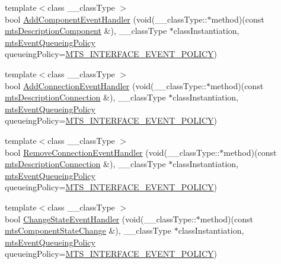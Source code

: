 \begin{DoxyCompactItemize}
\item 
{\footnotesize template$<$class \-\_\-\-\_\-class\-Type $>$ }\\bool \hyperlink{classmts_manager_component_services_aac555ce8c3bc4017ccbd8bb1d6aa40ad}{Add\-Component\-Event\-Handler} (void(\-\_\-\-\_\-class\-Type\-::$\ast$method)(const \hyperlink{classmts_description_component}{mts\-Description\-Component} \&), \-\_\-\-\_\-class\-Type $\ast$class\-Instantiation, \hyperlink{mts_forward_declarations_8h_a9286ac2ca46e5bcd57059550faa96916}{mts\-Event\-Queueing\-Policy} queueing\-Policy=\hyperlink{mts_forward_declarations_8h_a9286ac2ca46e5bcd57059550faa96916a3d4338e85690d50e9ab167be77cdefa0}{M\-T\-S\-\_\-\-I\-N\-T\-E\-R\-F\-A\-C\-E\-\_\-\-E\-V\-E\-N\-T\-\_\-\-P\-O\-L\-I\-C\-Y})
\item 
{\footnotesize template$<$class \-\_\-\-\_\-class\-Type $>$ }\\bool \hyperlink{classmts_manager_component_services_a36c0cf4ae83f2f64ff73a48ad6f48216}{Add\-Connection\-Event\-Handler} (void(\-\_\-\-\_\-class\-Type\-::$\ast$method)(const \hyperlink{classmts_description_connection}{mts\-Description\-Connection} \&), \-\_\-\-\_\-class\-Type $\ast$class\-Instantiation, \hyperlink{mts_forward_declarations_8h_a9286ac2ca46e5bcd57059550faa96916}{mts\-Event\-Queueing\-Policy} queueing\-Policy=\hyperlink{mts_forward_declarations_8h_a9286ac2ca46e5bcd57059550faa96916a3d4338e85690d50e9ab167be77cdefa0}{M\-T\-S\-\_\-\-I\-N\-T\-E\-R\-F\-A\-C\-E\-\_\-\-E\-V\-E\-N\-T\-\_\-\-P\-O\-L\-I\-C\-Y})
\item 
{\footnotesize template$<$class \-\_\-\-\_\-class\-Type $>$ }\\bool \hyperlink{classmts_manager_component_services_a87f6e1aa2352935f3b913691e4eec55d}{Remove\-Connection\-Event\-Handler} (void(\-\_\-\-\_\-class\-Type\-::$\ast$method)(const \hyperlink{classmts_description_connection}{mts\-Description\-Connection} \&), \-\_\-\-\_\-class\-Type $\ast$class\-Instantiation, \hyperlink{mts_forward_declarations_8h_a9286ac2ca46e5bcd57059550faa96916}{mts\-Event\-Queueing\-Policy} queueing\-Policy=\hyperlink{mts_forward_declarations_8h_a9286ac2ca46e5bcd57059550faa96916a3d4338e85690d50e9ab167be77cdefa0}{M\-T\-S\-\_\-\-I\-N\-T\-E\-R\-F\-A\-C\-E\-\_\-\-E\-V\-E\-N\-T\-\_\-\-P\-O\-L\-I\-C\-Y})
\item 
{\footnotesize template$<$class \-\_\-\-\_\-class\-Type $>$ }\\bool \hyperlink{classmts_manager_component_services_a1f6ea6e32a98f6e314b52f9d9d594e06}{Change\-State\-Event\-Handler} (void(\-\_\-\-\_\-class\-Type\-::$\ast$method)(const \hyperlink{classmts_component_state_change}{mts\-Component\-State\-Change} \&), \-\_\-\-\_\-class\-Type $\ast$class\-Instantiation, \hyperlink{mts_forward_declarations_8h_a9286ac2ca46e5bcd57059550faa96916}{mts\-Event\-Queueing\-Policy} queueing\-Policy=\hyperlink{mts_forward_declarations_8h_a9286ac2ca46e5bcd57059550faa96916a3d4338e85690d50e9ab167be77cdefa0}{M\-T\-S\-\_\-\-I\-N\-T\-E\-R\-F\-A\-C\-E\-\_\-\-E\-V\-E\-N\-T\-\_\-\-P\-O\-L\-I\-C\-Y})
\end{DoxyCompactItemize}

